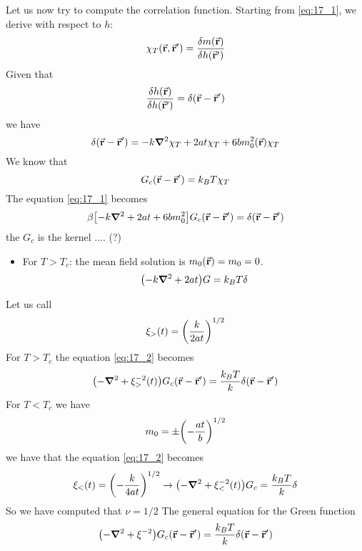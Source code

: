 \documentclass[../main/main.tex]{subfiles}
\begin{document}
Let us now try to compute the correlation function. Starting from \eqref{eq:17_1}, we derive with respect to \( h \):
\begin{equation}
  \chi _T (\va{r},\va{r}') = \frac{\delta m(\va{r})}{\delta h (\va{r}')}
\end{equation}
Given that
\begin{equation}
  \frac{\delta h (\va{r})}{\delta h (\va{r}')} = \delta (\va{r}-\va{r}')
\end{equation}
we have
\begin{equation}
  \delta  (\va{r} - \va{r}')  = - k \grad ^2 \chi _T + 2 a t  \chi _T  + 6 b m_0^2 (\va{r}) \chi _T
\end{equation}
We know that
\begin{equation}
  G_c (\va{r}-\va{r}') = k_B T \chi _T
\end{equation}
The equation \eqref{eq:17_1} becomes
\begin{equation}
  \beta \qty[-k \grad ^2 + 2 a t + 6 b m_0 ^2 ] G_c (\va{r}-\va{r}') = \delta (\va{r}- \va{r}')
\end{equation}
the \( G_c \) is the kernel .... (?)
\begin{itemize}
\item For \( T > T_c \): the mean field solution is \( m_0 (\va{r}) = m_0 = 0 \).
\begin{equation}
  \qty(-k \grad ^2 + 2 a t ) G = k_B T \delta
  \label{eq:17_2}
\end{equation}
\end{itemize}
Let us call
\begin{equation}
  \xi_> (t) = \qty(\frac{k}{2 a t })^{1/2}
\end{equation}
For \( T > T_c \) the equation \eqref{eq:17_2} becomes
\begin{equation}
  \qty(-\grad ^2 + \xi _> ^{-2} (t)) G_c (\va{r}-\va{r}') = \frac{k_B T}{k} \delta (\va{r}-\va{r}')
\end{equation}
For \( T < T_c \) we have
\begin{equation}
  m_0 = \pm \qty(-\frac{at}{b})^{1/2}
\end{equation}
we have that the equation \eqref{eq:17_2} becomes
\begin{equation}
  \xi _{<} (t) = \qty(- \frac{k}{4at})^{1/2}  \rightarrow \qty(-\grad ^2 + \xi _<^{-2} (t))G_c = \frac{k_B T}{k} \delta
\end{equation}
So we have computed that \( \nu = 1/2 \)
The general equation for the Green function
\begin{equation}
  \qty(- \grad ^2 + \xi ^{-2}) G_c (\va{r}-\va{r}') = \frac{k_B T}{k} \delta (\va{r}-\va{r}') 
\end{equation}
\end{document}
